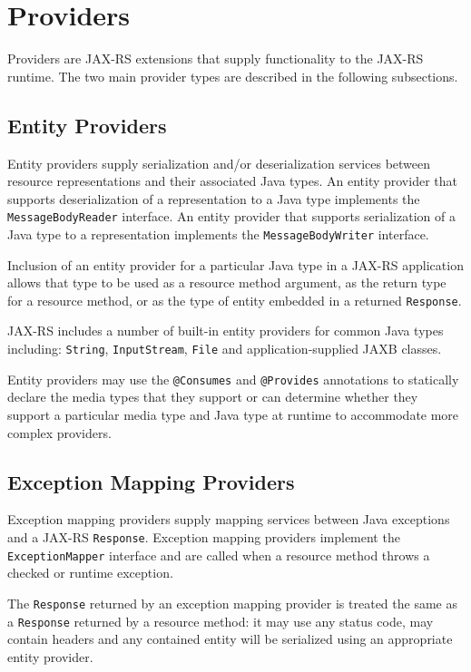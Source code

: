 \documentclass{acm_proc_article-sp}
\begin{document}
\section{Providers}
\label{providers}

Providers are JAX-RS extensions that supply functionality to the JAX-RS runtime. The two main provider types are described in the following subsections.

\subsection{Entity Providers}

Entity providers supply serialization and/or deserialization services between resource representations and their associated Java types. An entity provider that supports deserialization of a representation to a Java type implements the \texttt{Message\-Body\-Reader} interface. An entity provider that supports serialization of a Java type to a representation implements the \texttt{Message\-Body\-Writer} interface.

Inclusion of an entity provider for a particular Java type in a JAX-RS application allows that type to be used as a resource method argument, as the return type for a resource method, or as the type of entity embedded in a returned \texttt{Response}.

JAX-RS includes a number of built-in entity providers for common Java types including: \texttt{String}, \texttt{InputStream}, \texttt{File} and application-supplied JAXB classes.

\balancecolumns

Entity providers may use the \texttt{@Consumes} and \texttt{@Provides} annotations to statically declare the media types that they support or can determine whether they support a particular media type and Java type at runtime to accommodate more complex providers.

\subsection{Exception Mapping Providers}
\label{exceptionmapping}

Exception mapping providers supply mapping services between Java exceptions and a JAX-RS \texttt{Response}. Exception mapping providers implement the \texttt{ExceptionMapper} interface and are called when a resource method throws a checked or runtime exception.

The \texttt{Response} returned by an exception mapping provider is treated the same as a \texttt{Response} returned by a resource method: it may use any status code, may contain headers and any contained entity will be serialized using an appropriate entity provider.
\end{document}
